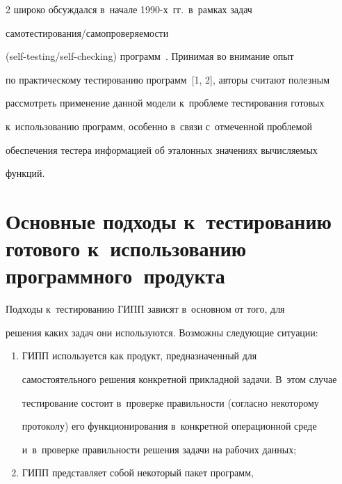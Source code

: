 \begin{multicols}{2}
широко обсуждался в~начале 1990-х~гг.\ в~рамках задач  


са\-мо\-тес\-ти\-ро\-ва\-ния/са\-мо\-про\-ве\-ря\-емости  


(self-testing/self-checking) программ~\cite{6-bf}. Принимая во внимание опыт 


по практическому тестированию программ~[1, 2], авторы считают полезным 


рассмотреть применение данной модели к~проблеме тестирования готовых 


к~использованию программ, особенно в~связи с~отмеченной проблемой 


обеспечения тестера информацией об эталонных значениях вычисляемых 


функций.





\vspace*{-6pt}


    


\section{Основные подходы к~тестированию готового к~использованию программного~продукта}





\vspace*{-2pt}


    


    Подходы к~тестированию ГИПП зависят в~основном от того, для 


решения каких задач они используются. Возможны следующие ситуации:


    \begin{enumerate}[(1)]


    \item ГИПП используется как продукт, предназначенный для 


самостоятельного решения конкретной прикладной задачи. В~этом случае 


тестирование состоит в~проверке правильности (согласно некоторому 


протоколу) его функционирования в~конкретной операционной среде 


и~в~проверке правильности решения задачи на рабочих данных;


    \item ГИПП представляет собой некоторый пакет программ, 



\end{enumerate}
\end{multicols}
